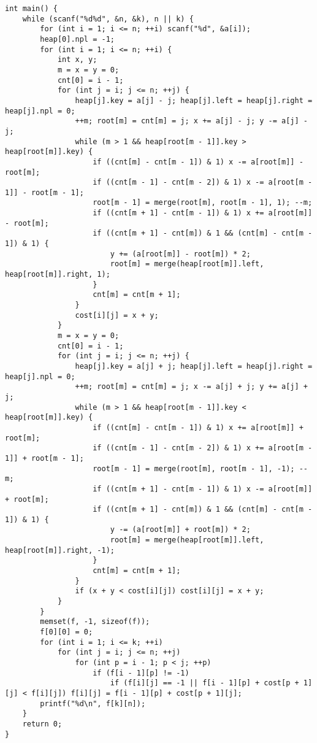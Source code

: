 \begin{verbatim}
int main() {
    while (scanf("%d%d", &n, &k), n || k) {
        for (int i = 1; i <= n; ++i) scanf("%d", &a[i]);
        heap[0].npl = -1;
        for (int i = 1; i <= n; ++i) {
            int x, y;
            m = x = y = 0;
            cnt[0] = i - 1;
            for (int j = i; j <= n; ++j) {
                heap[j].key = a[j] - j; heap[j].left = heap[j].right = heap[j].npl = 0;
                ++m; root[m] = cnt[m] = j; x += a[j] - j; y -= a[j] - j;
                while (m > 1 && heap[root[m - 1]].key > heap[root[m]].key) {
                    if ((cnt[m] - cnt[m - 1]) & 1) x -= a[root[m]] - root[m];
                    if ((cnt[m - 1] - cnt[m - 2]) & 1) x -= a[root[m - 1]] - root[m - 1];
                    root[m - 1] = merge(root[m], root[m - 1], 1); --m;
                    if ((cnt[m + 1] - cnt[m - 1]) & 1) x += a[root[m]] - root[m];
                    if ((cnt[m + 1] - cnt[m]) & 1 && (cnt[m] - cnt[m - 1]) & 1) {
                        y += (a[root[m]] - root[m]) * 2;
                        root[m] = merge(heap[root[m]].left, heap[root[m]].right, 1);
                    }
                    cnt[m] = cnt[m + 1];
                }
                cost[i][j] = x + y;
            }
            m = x = y = 0;
            cnt[0] = i - 1;
            for (int j = i; j <= n; ++j) {
                heap[j].key = a[j] + j; heap[j].left = heap[j].right = heap[j].npl = 0;
                ++m; root[m] = cnt[m] = j; x -= a[j] + j; y += a[j] + j;
                while (m > 1 && heap[root[m - 1]].key < heap[root[m]].key) {
                    if ((cnt[m] - cnt[m - 1]) & 1) x += a[root[m]] + root[m];
                    if ((cnt[m - 1] - cnt[m - 2]) & 1) x += a[root[m - 1]] + root[m - 1];
                    root[m - 1] = merge(root[m], root[m - 1], -1); --m;
                    if ((cnt[m + 1] - cnt[m - 1]) & 1) x -= a[root[m]] + root[m];
                    if ((cnt[m + 1] - cnt[m]) & 1 && (cnt[m] - cnt[m - 1]) & 1) {
                        y -= (a[root[m]] + root[m]) * 2;
                        root[m] = merge(heap[root[m]].left, heap[root[m]].right, -1);
                    }
                    cnt[m] = cnt[m + 1];
                }
                if (x + y < cost[i][j]) cost[i][j] = x + y;
            }
        }
        memset(f, -1, sizeof(f));
        f[0][0] = 0;
        for (int i = 1; i <= k; ++i)
            for (int j = i; j <= n; ++j)
                for (int p = i - 1; p < j; ++p)
                    if (f[i - 1][p] != -1)
                        if (f[i][j] == -1 || f[i - 1][p] + cost[p + 1][j] < f[i][j]) f[i][j] = f[i - 1][p] + cost[p + 1][j];
        printf("%d\n", f[k][n]);
    }
    return 0;
}
\end{verbatim}
